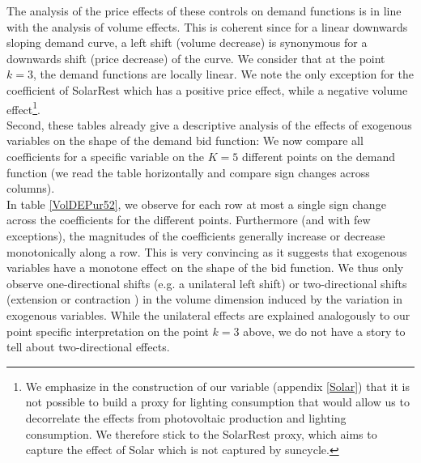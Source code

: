 The analysis of the price effects of these controls on demand functions is in line with the analysis of volume effects. This is coherent since for a linear downwards sloping demand curve, a left shift (volume decrease) is synonymous for a downwards shift (price decrease) of the curve. We consider that at the point $k=3$, the demand functions are locally linear. We note the only exception for the coefficient of SolarRest which has a positive price effect, while a negative volume effect\footnote{We emphasize in the construction of our variable (appendix \ref{Solar}) that it is not possible to build a proxy for lighting consumption that would allow us to decorrelate the effects from photovoltaic production and lighting consumption. We therefore stick to the SolarRest proxy, which aims to capture the effect of Solar which is not captured by suncycle.}. \\

Second, these tables already give a descriptive analysis of the effects of exogenous variables on the shape of the demand bid function:
We now compare all coefficients for a specific variable on the $K=5$ different points on the demand function (we read the table horizontally and compare sign changes across columns).\\

In table \ref{VolDEPur52}, we observe for each row at most a single sign change across the coefficients for the different points. Furthermore (and with few exceptions), the magnitudes of the coefficients generally increase or decrease monotonically along a row. 
This is very convincing as it suggests that exogenous variables have a monotone effect on the shape of the bid function. We thus only observe one-directional shifts (e.g. a unilateral left shift) or two-directional shifts (extension or contraction%
) in the volume dimension induced by the variation in exogenous variables. While the unilateral effects are explained analogously to our point specific interpretation on the point $k=3$ above, we do not have a story to tell about two-directional effects.\\

